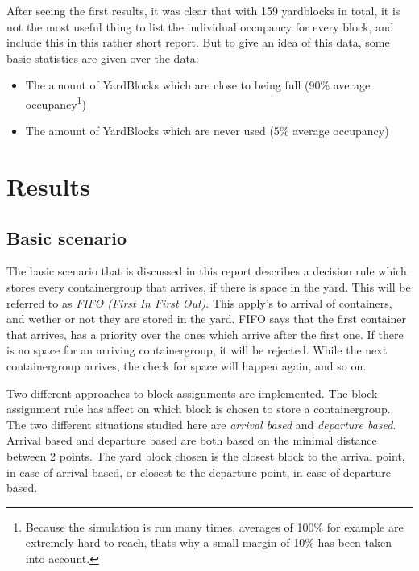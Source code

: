 \documentclass[]{article}
\begin{document}
After seeing the first results, it was clear that with 159 yardblocks in total,
it is not the most useful thing to list the individual occupancy for every
block, and include this in this rather short report. But to give an idea of
this data, some basic statistics are given over the data: \begin{itemize}
	\item The amount of YardBlocks which are close to being full (90\% average
	      occupancy\footnote{\label{margin} Because the simulation is run many times,
		      averages of 100\% for example are extremely hard to reach, thats why a small
		      margin of 10\% has been taken into account.})
	\item The amount of YardBlocks which are never used (5\% average
	      occupancy)
\end{itemize}

\section{Results}

\subsection{Basic scenario}
The basic scenario that is discussed in this report describes a decision rule
which stores every containergroup that arrives, if there is space in the yard.
This will be referred to as \textit{FIFO (First In First Out)}. This apply's to
arrival of containers, and wether or not they are stored in the yard. FIFO says
that the first container that arrives, has a priority over the ones which
arrive after the first one. If there is no space for an arriving
containergroup, it will be rejected. While the next containergroup arrives, the
check for space will happen again, and so on.

Two different approaches to block assignments are implemented. The block
assignment rule has affect on which block is chosen to store a containergroup.
The two different situations studied here are \textit{arrival based} and
\textit{departure based}. Arrival based and departure based are both based on
the minimal distance between 2 points. The yard block chosen is the closest
block to the arrival point, in case of arrival based, or closest to the
departure point, in case of departure based.
\end{document}
